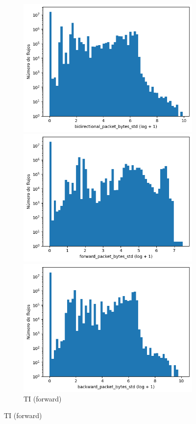 \begin{figure}[H]
\begin{subfigure}[b]{0.26\textwidth}
        \includegraphics[width=\linewidth]{media/packet_pincer_toniot/bidirectional_packet_bytes_std_log_x_log_y.png}
        \caption{TI (bidir.)}
        \includegraphics[width=\textwidth]{media/packet_pincer_toniot/forward_packet_bytes_std_log_x_log_y.png}
        \caption{TI (forward)}
        \includegraphics[width=\textwidth]{media/packet_pincer_toniot/backward_packet_bytes_std_log_x_log_y.png}

\end{subfigure}
\end{figure}
